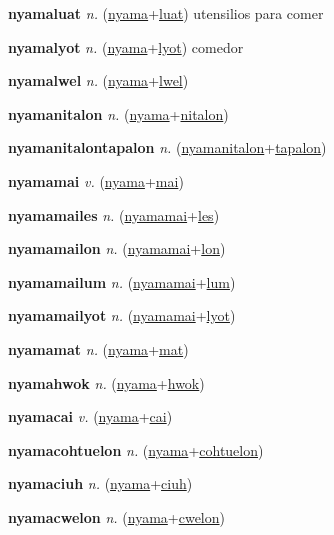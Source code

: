 \textbf{\hypertarget{nyamaluat}{nyamaluat}} \textit{n.} (\hyperlink{nyama}{nyama}+\allowbreak \hyperlink{luat}{luat})
utensilios para comer

\textbf{\hypertarget{nyamalyot}{nyamalyot}} \textit{n.} (\hyperlink{nyama}{nyama}+\allowbreak \hyperlink{lyot}{lyot})
comedor

\textbf{\hypertarget{nyamalwel}{nyamalwel}} \textit{n.} (\hyperlink{nyama}{nyama}+\allowbreak \hyperlink{lwel}{lwel})


\textbf{\hypertarget{nyamanitalon}{nyamanitalon}} \textit{n.} (\hyperlink{nyama}{nyama}+\allowbreak \hyperlink{nitalon}{nitalon})


\textbf{\hypertarget{nyamanitalontapalon}{nyamanitalontapalon}} \textit{n.} (\hyperlink{nyamanitalon}{nyamanitalon}+\allowbreak \hyperlink{tapalon}{tapalon})


\textbf{\hypertarget{nyamamai}{nyamamai}} \textit{v.} (\hyperlink{nyama}{nyama}+\allowbreak \hyperlink{mai}{mai})


\textbf{\hypertarget{nyamamailes}{nyamamailes}} \textit{n.} (\hyperlink{nyamamai}{nyamamai}+\allowbreak \hyperlink{les}{les})


\textbf{\hypertarget{nyamamailon}{nyamamailon}} \textit{n.} (\hyperlink{nyamamai}{nyamamai}+\allowbreak \hyperlink{lon}{lon})


\textbf{\hypertarget{nyamamailum}{nyamamailum}} \textit{n.} (\hyperlink{nyamamai}{nyamamai}+\allowbreak \hyperlink{lum}{lum})


\textbf{\hypertarget{nyamamailyot}{nyamamailyot}} \textit{n.} (\hyperlink{nyamamai}{nyamamai}+\allowbreak \hyperlink{lyot}{lyot})


\textbf{\hypertarget{nyamamat}{nyamamat}} \textit{n.} (\hyperlink{nyama}{nyama}+\allowbreak \hyperlink{mat}{mat})


\textbf{\hypertarget{nyamahwok}{nyamahwok}} \textit{n.} (\hyperlink{nyama}{nyama}+\allowbreak \hyperlink{hwok}{hwok})


\textbf{\hypertarget{nyamacai}{nyamacai}} \textit{v.} (\hyperlink{nyama}{nyama}+\allowbreak \hyperlink{cai}{cai})


\textbf{\hypertarget{nyamacohtuelon}{nyamacohtuelon}} \textit{n.} (\hyperlink{nyama}{nyama}+\allowbreak \hyperlink{cohtuelon}{cohtuelon})


\textbf{\hypertarget{nyamaciuh}{nyamaciuh}} \textit{n.} (\hyperlink{nyama}{nyama}+\allowbreak \hyperlink{ciuh}{ciuh})


\textbf{\hypertarget{nyamacwelon}{nyamacwelon}} \textit{n.} (\hyperlink{nyama}{nyama}+\allowbreak \hyperlink{cwelon}{cwelon})


